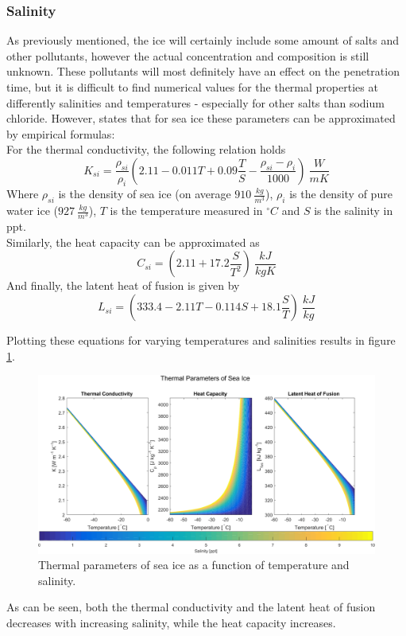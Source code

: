 \subsubsection{Salinity} \label{sec:iceSalinity}
As previously mentioned, the ice will certainly include some amount of salts and other pollutants, however the actual concentration and composition is still unknown. These pollutants will most definitely have an effect on the penetration time, but it is difficult to find numerical values for the thermal properties at differently salinities and temperatures - especially for other salts than sodium chloride. However, \citet{book:thomas2009sea} states that for sea ice these parameters can be approximated by empirical formulas:\\

\noindent
For the thermal conductivity, the following relation holds
\begin{equation}
K_{si}=\frac{\rho_{si}}{\rho_i}\left(2.11 - 0.011 T + 0.09 \frac{T}{S} - \frac{\rho_{si}-\rho_i}{1000}\right)\SI{}{\frac{W}{m K}}
\end{equation}
Where $\rho_{si}$ is the density of sea ice (on average $\SI{910}{\frac{kg}{m^3}}$\cite{article:timco19961}), $\rho_i$ is the density of pure water ice ($\SI{927}{\frac{kg}{m^3}}$), $T$ is the temperature measured in $^\circ C$ and $S$ is the salinity in ppt.\\
Similarly, the heat capacity can be approximated as
\begin{equation}
C_{si} = \left(2.11 + 17.2 \frac{S}{T^2}\right)\SI{}{\frac{kJ}{kg K}}
\end{equation}
And finally, the latent heat of fusion is given by
\begin{equation}
L_{si}=\left(333.4-2.11T-0.114S+18.1\frac{S}{T}\right)\SI{}{\frac{kJ}{kg}}
\end{equation}

\noindent
Plotting these equations for varying temperatures and salinities results in figure \ref{fig:iceSalinity}.
\begin{figure}[ht]
	\centering
	\includegraphics[width=.9\textwidth]{figures/LAMC/salinity}
	\caption{Thermal parameters of sea ice as a function of temperature and salinity.}
	\label{fig:iceSalinity}
\end{figure}
As can be seen, both the thermal conductivity and the latent heat of fusion decreases with increasing salinity, while the heat capacity increases. \\

